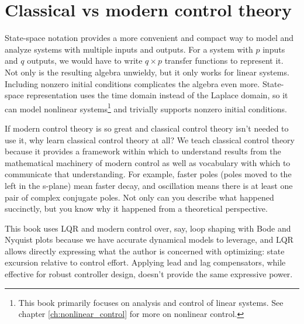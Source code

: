 \section{Classical vs modern control theory}

State-space notation provides a more convenient and compact way to model and
analyze \glspl{system} with multiple \glspl{input} and \glspl{output}. For a
\gls{system} with $p$ \glspl{input} and $q$ \glspl{output}, we would have to
write $q \times p$ transfer functions to represent it. Not only is the resulting
algebra unwieldy, but it only works for linear \glspl{system}. Including nonzero
initial conditions complicates the algebra even more. State-space representation
uses the time domain instead of the Laplace domain, so it can model nonlinear
\glspl{system}\footnote{This book primarily focuses on analysis and control of
linear \glspl{system}. See chapter \ref{ch:nonlinear_control} for more on
nonlinear control.} and trivially supports nonzero initial conditions.

If modern control theory is so great and classical control theory isn't needed
to use it, why learn classical control theory at all? We teach classical control
theory because it provides a framework within which to understand results from
the mathematical machinery of modern control as well as vocabulary with which to
communicate that understanding. For example, faster poles (poles moved to the
left in the s-plane) mean faster decay, and oscillation means there is at least
one pair of complex conjugate poles. Not only can you describe what happened
succinctly, but you know why it happened from a theoretical perspective.

This book uses LQR and modern control over, say, loop shaping with Bode and
Nyquist plots because we have accurate dynamical models to leverage, and LQR
allows directly expressing what the author is concerned with optimizing: state
excursion relative to control effort. Applying lead and lag compensators, while
effective for robust controller design, doesn't provide the same expressive
power.
